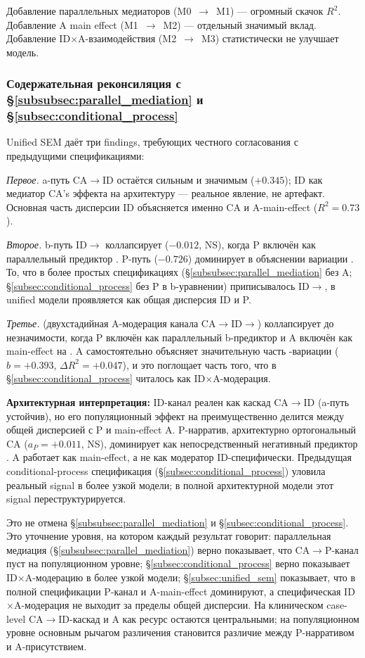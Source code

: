 Добавление параллельных медиаторов (M0~$\to$~M1) --- огромный скачок $R^2$. Добавление A main effect (M1~$\to$~M2) --- отдельный значимый вклад. Добавление ID$\times$A-взаимодействия (M2~$\to$~M3) статистически не улучшает модель.

\subsubsection{\texorpdfstring{Содержательная реконсиляция с §\ref{subsubsec:parallel_mediation} и §\ref{subsec:conditional_process}}{Содержательная реконсиляция с параллельной медиацией и conditional process}}

Unified SEM даёт три findings, требующих честного согласования с предыдущими спецификациями:

\textit{Первое.} a-путь CA$\to$ID остаётся сильным и значимым ($+0.345$); ID как медиатор CA's эффекта на архитектуру --- реальное явление, не артефакт. Основная часть дисперсии ID объясняется именно CA и A-main-effect ($R^2 = 0.73$).

\textit{Второе.} b-путь ID$\to$\EAF{} коллапсирует ($-0.012$, NS), когда P включён как параллельный предиктор \EAF{}. P-путь ($-0.726$) доминирует в объяснении вариации \EAF{}. То, что в более простых спецификациях (§\ref{subsubsec:parallel_mediation} без A; §\ref{subsec:conditional_process} без P в b-уравнении) приписывалось ID$\to$\EAF{}, в unified модели проявляется как общая дисперсия ID и P.

\textit{Третье.} \IMM{} (двухстадийная A-модерация канала CA$\to$ID$\to$\EAF{}) коллапсирует до незначимости, когда P включён как параллельный b-предиктор и A включён как main-effect на \EAF{}. A самостоятельно объясняет значительную часть \EAF{}-вариации ($b = +0.393$, $\Delta R^2 = +0.047$), и это поглощает часть того, что в §\ref{subsec:conditional_process} читалось как ID$\times$A-модерация.

\textbf{Архитектурная интерпретация:} ID-канал реален как каскад CA$\to$ID (a-путь устойчив), но его популяционный эффект на \EAF{} преимущественно делится между общей дисперсией с P и main-effect A. P-нарратив, архитектурно ортогональный CA ($a_P = +0.011$, NS), доминирует как непосредственный негативный предиктор \EAF{}. A работает как main-effect, а не как модератор ID-специфически. Предыдущая conditional-process спецификация (§\ref{subsec:conditional_process}) уловила реальный signal в более узкой модели; в полной архитектурной модели этот signal переструктурируется.

Это не отмена §\ref{subsubsec:parallel_mediation} и §\ref{subsec:conditional_process}. Это уточнение уровня, на котором каждый результат говорит: параллельная медиация (§\ref{subsubsec:parallel_mediation}) верно показывает, что CA$\to$P-канал пуст на популяционном уровне; §\ref{subsec:conditional_process} верно показывает ID$\times$A-модерацию в более узкой модели; §\ref{subsec:unified_sem} показывает, что в полной спецификации P-канал и A-main-effect доминируют, а специфическая ID$\times$A-модерация не выходит за пределы общей дисперсии. На клиническом case-level CA$\to$ID-каскад и A как ресурс остаются центральными; на популяционном уровне основным рычагом различения \EAF{} становится различие между P-нарративом и A-присутствием.


